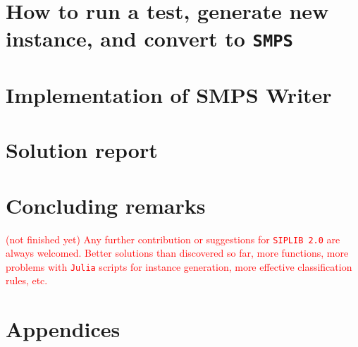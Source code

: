 \section{How to run a test, generate new instance, and convert to \texttt{SMPS}}\label{sec:tutorial}



\pagebreak

\section{Implementation of SMPS Writer}\label{sec:smps_writer}

\pagebreak

\section{Solution report}\label{sec:solution}

\pagebreak

\section{Concluding remarks}
\textcolor{red}{(not finished yet) Any further contribution or suggestions for \texttt{SIPLIB 2.0} are always welcomed. Better solutions than discovered so far, more functions, more problems with \texttt{Julia} scripts for instance generation, more effective classification rules, etc.}
\pagebreak


\appendix
\section*{Appendices}




